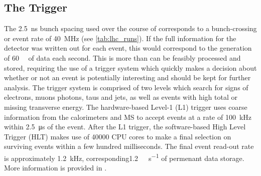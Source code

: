 \subsection{The Trigger}\label{sec:trigger}
The \SI{2.5}{\nano\second} bunch spacing used over the course of \runtwo corresponds to a bunch-crossing or event rate of \SI{40}{\mega\hertz} (see \cref{tab:lhc_runs}).
If the full information for the detector was written out for each event, this would correspond to the generation of \SI{60}{\tera\byte} of data each second.
This is more than can be feasibly processed and stored, requiring the use of a trigger system which quickly makes a decision about whether or not an event is potentially interesting and should be kept for further analysis.
The trigger system is comprised of two levels which search for signs of electrons, muons photons, taus and jets, as well as events with high total or missing transverse energy.
The hardware-based Level-1 (L1) trigger uses coarse information from the calorimeters and MS to accept events at a rate of \SI{100}{\kilo\hertz} within \SI{2.5}{\micro\second} of the event.
After the L1 trigger, the software-based High Level Trigger (HLT) makes use of \num{40000} CPU cores to make a final selection on surviving events within a few hundred milliseconds. 
The final event read-out rate is approximately \SI{1.2}{\kilo\hertz}, corresponding\SI{1.2}{\giga\byte\per\second} of permenant data storage.
More information is provided in \cite{TRIG-2016-01}.


